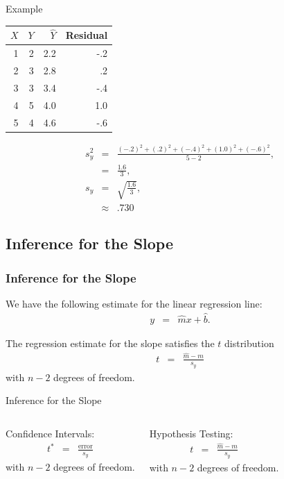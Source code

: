 \begin{frame}{Example}

  \begin{tabular}{r|r|r|r}
    $X$ & $Y$ & $\hat{Y}$ & Residual \\ \hline
    1 & 2 & 2.2 & -.2 \\
    2 & 3 & 2.8 &  .2 \\
    3 & 3 & 3.4 & -.4 \\
    4 & 5 & 4.0 & 1.0  \\
    5 & 4 & 4.6 & -.6
  \end{tabular}

  \begin{eqnarray*}
    s^2_y & = & \frac{ (-.2)^2 + (.2)^2 + (-.4)^2 + (1.0)^2 + (-.6)^2}{5-2}, \\
    & = & \frac{1.6}{3}, \\
    s_y & = & \sqrt{\frac{1.6}{3}}, \\
    & \approx & .730
  \end{eqnarray*}
  
\end{frame}
  

\subsection{Inference for the Slope}

\begin{frame}
  \frametitle{Inference for the Slope}

  We have the following estimate for the linear regression line:
  \begin{eqnarray*}
    y & = & \hat{m} x + \hat{b}.
  \end{eqnarray*}

  \begin{definition}
    The regression estimate for the slope satisfies the $t$ distribution
    \begin{eqnarray*}
      t & = & \frac{\hat{m}-m}{s_y}
    \end{eqnarray*}
    with $n-2$ degrees of freedom.
  \end{definition}

\end{frame}


\begin{frame}{Inference for the Slope}

  \begin{columns}

    Confidence Intervals:
    \begin{eqnarray*}
      t^* & = & \frac{\mathrm{error}}{s_y}
    \end{eqnarray*}
    with $n-2$ degrees of freedom.


    Hypothesis Testing:
    \begin{eqnarray*}
      t & = & \frac{\hat{m}-m}{s_y}
    \end{eqnarray*}
    with $n-2$ degrees of freedom.

    
  \end{columns}

\end{frame}

